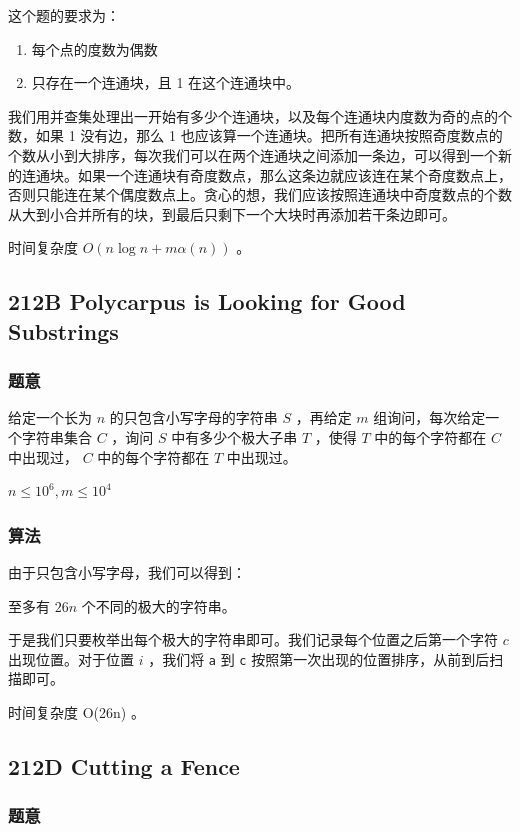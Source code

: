 \documentclass[11pt]{article}
\begin{document}
    这个题的要求为：
\begin{enumerate}
\item 每个点的度数为偶数
\item 只存在一个连通块，且 1 在这个连通块中。
\end{enumerate}

    我们用并查集处理出一开始有多少个连通块，以及每个连通块内度数为奇的点的个数，如果 1 没有边，那么 1 也应该算一个连通块。把所有连通块按照奇度数点的个数从小到大排序，每次我们可以在两个连通块之间添加一条边，可以得到一个新的连通块。如果一个连通块有奇度数点，那么这条边就应该连在某个奇度数点上，否则只能连在某个偶度数点上。贪心的想，我们应该按照连通块中奇度数点的个数从大到小合并所有的块，到最后只剩下一个大块时再添加若干条边即可。

    时间复杂度 $O(n \log n + m \alpha (n))$ 。
\subsection{212B  Polycarpus is Looking for Good Substrings}
\label{sec-12-4}
\subsubsection{题意}
\label{sec-12-4-1}

给定一个长为 $n$ 的只包含小写字母的字符串 $S$ ，再给定 $m$ 组询问，每次给定一个字符串集合 $C$ ，询问 $S$ 中有多少个极大子串 $T$ ，使得 $T$ 中的每个字符都在 $C$ 中出现过， $C$ 中的每个字符都在 $T$ 中出现过。

$n \leq 10^6, m \leq 10^4$
\subsubsection{算法}
\label{sec-12-4-2}

由于只包含小写字母，我们可以得到：
\begin{theorem}
  至多有 $26n$ 个不同的极大的字符串。
\end{theorem}

于是我们只要枚举出每个极大的字符串即可。我们记录每个位置之后第一个字符 $c$ 出现位置。对于位置 $i$ ，我们将 \texttt{a} 到 \texttt{c} 按照第一次出现的位置排序，从前到后扫描即可。

时间复杂度 O(26n) 。
\subsection{212D  Cutting a Fence}
\label{sec-12-5}
\subsubsection{题意}
\label{sec-12-5-1}
\end{document}
